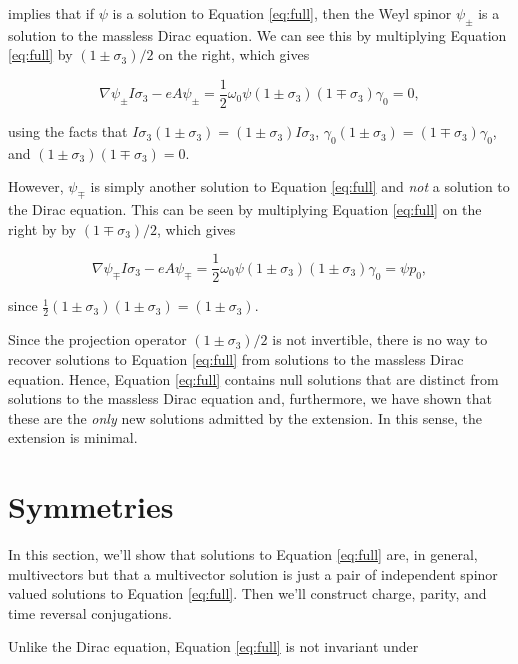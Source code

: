 \documentclass{article}
\begin{document}
  implies that if $\psi$ is a solution to Equation \ref{eq:full}, then the Weyl spinor $\psi_\pm$ is a solution to the massless Dirac equation. We can see this by multiplying Equation \ref{eq:full} by $(1 \pm \sigma_3)/2$ on the right, which gives

  \begin{equation}
    \nabla \psi_\pm I \sigma_3 - e A \psi_\pm = \frac{1}{2} \omega_0 \psi (1 \pm \sigma_3)(1 \mp \sigma_3) \gamma_0 = 0,
  \end{equation}

  using the facts that $I \sigma_3 (1 \pm \sigma_3) = (1 \pm \sigma_3) I \sigma_3$, $\gamma_0 (1 \pm \sigma_3) = (1 \mp \sigma_3)\gamma_0$, and $(1 \pm \sigma_3) (1 \mp \sigma_3) = 0$.

  However, $\psi_\mp$ is simply another solution to Equation \ref{eq:full} and \emph{not} a solution to the Dirac equation. This can be seen by multiplying Equation \ref{eq:full} on the right by by $(1 \mp \sigma_3)/2$, which gives

  \begin{equation}
    \nabla \psi_\mp I \sigma_3 - e A \psi_\mp = \frac{1}{2} \omega_0 \psi(1 \pm \sigma_3)(1 \pm \sigma_3) \gamma_0 = \psi p_0,
  \end{equation}

  since $\frac{1}{2}(1 \pm \sigma_3)(1 \pm \sigma_3) = (1 \pm \sigma_3)$.

  Since the projection operator $(1 \pm \sigma_3)/2$ is not invertible, there is no way to recover solutions to Equation \ref{eq:full} from solutions to the massless Dirac equation. Hence, Equation \ref{eq:full} contains null solutions that are distinct from solutions to the massless Dirac equation and, furthermore, we have shown that these are the \emph{only} new solutions admitted by the extension. In this sense, the extension is minimal.

  \section{Symmetries} \label{symmetries}

  In this section, we'll show that solutions to Equation \ref{eq:full} are, in general, multivectors but that a multivector solution is just a pair of independent spinor valued solutions to Equation \ref{eq:full}. Then we'll construct charge, parity, and time reversal conjugations.

  Unlike the Dirac equation, Equation \ref{eq:full} is not invariant under
\end{document}
